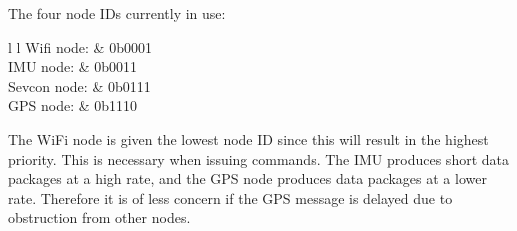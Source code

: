 The four node IDs currently in use:
\begin{table}[h]
	\begin{tabular}{{l} {l}}
		Wifi node: & 0b0001 \\
		IMU node: & 0b0011 \\
		Sevcon node: & 0b0111 \\
		GPS node: & 0b1110
	\end{tabular}
\end{table}

The WiFi node is given the lowest node ID since this will result in the highest priority.
This is necessary when issuing commands.
The IMU produces short data packages at a high rate, and the GPS node produces data packages at a lower rate. 
Therefore it is of less concern if the GPS message is delayed due to obstruction from other nodes. 
